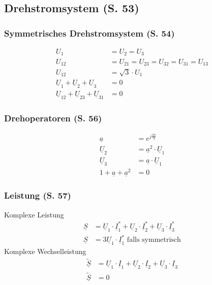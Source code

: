 \documentclass[a4paper,twocolumn,10pt]{article}
\begin{document}
\subsection{Drehstromsystem (S. 53)}

\subsubsection{Symmetrisches Drehstromsystem (S. 54)}
\begin{equation*}
\begin{split}
U_1&=U_2=U_3\\
U_{12}&=U_{21}=U_{23}=U_{32}=U_{31}=U_{13}\\
U_{12}&=\sqrt{3}\cdot U_1\\
\underline{U}_1+\underline{U}_2+\underline{U}_3&=0\\
\underline{U}_{12}+\underline{U}_{23}+\underline{U}_{31}&=0
\end{split}
\end{equation*}

\subsubsection{Drehoperatoren (S. 56)}
\begin{equation*}
\begin{split}
\underline{a}&=e^{j\frac{2\pi}{3}}\\
\underline{U}_2&=\underline{a}^2\cdot\underline{U}_1\\
\underline{U}_3&=\underline{a}\cdot\underline{U}_1\\
1+\underline{a}+\underline{a}^2&=0
\end{split}
\end{equation*}

\subsubsection{Leistung (S. 57)}
Komplexe Leistung
\begin{equation*}
\begin{split}
\underline{S}&=\underline{U}_1\cdot\underline{I}_1^*+\underline{U}_2\cdot\underline{I}_2^*+\underline{U}_3\cdot\underline{I}_3^*\\
\underline{S}&=3\underline{U}_1\cdot\underline{I}_1^*\text{ falls symmetrisch}
\end{split}
\end{equation*}
Komplexe Wechselleistung
\begin{equation*}
\begin{split}
\underline{\tilde{S}}&=\underline{U}_1\cdot\underline{I}_1+\underline{U}_2\cdot\underline{I}_2+\underline{U}_3\cdot\underline{I}_3\\
\underline{\tilde{S}}&=0
\end{split}
\end{equation*}
\end{document}
